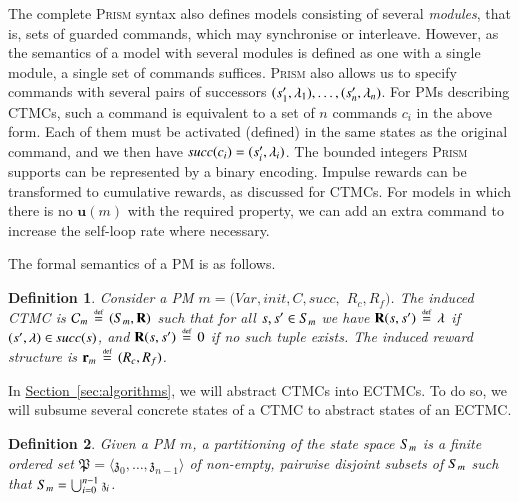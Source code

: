\documentclass[10pt,twocolumn]{article}
\newtheorem{definition}{Definition}
\newcommand{\PRISM}{\textsc{Prism}\xspace}
\newcommand{\states} {{\ensuremath S}}
\newcommand{\state}  {{\ensuremath s}}
\newcommand{\rmat}{\mathbf{R}}
\newcommand{\cmodel}{\mathcal{C}}
\newcommand{\urate}{\mathbf{u}}
\newcommand{\rew}{\mathbf{r}}
\newcommand{\apart}{\mathfrak{P}}
\newcommand{\astate}{\mathfrak{z}}
\newcommand{\prismModel}{m}
\newcommand{\prismVars}{\mathit{Var}}
\newcommand{\prismInit}{\mathit{init}}
\newcommand{\prismSucc}{\mathit{succ}}
\newcommand{\prismCmds}{C}
\newcommand{\prismCmd}{c}
\newcommand{\prismCRew}{R_c}
\newcommand{\prismFRew}{R_f}
\newcommand{\refsec}[1]{\texorpdfstring{\hyperref[sec:#1]{Section~\ref*{sec:#1}}}{Section~\ref*{sec:#1}}}
\newcommand{\defeq}{\,\stackrel{\mbox{\rm {\tiny def}}}{=}\,}
\begin{document}
The complete \PRISM syntax also defines models consisting of several \emph{modules}, that is, sets of guarded commands, which may synchronise or interleave.
However, as the semantics of a model with several modules is defined as one with a single module, a single set of commands suffices.
\PRISM also allows us to specify commands with several pairs of successors $(\state_1',\lambda_1), \ldots, (\state_n', \lambda_n)$.
For PMs describing CTMCs, such a command is equivalent to a set of $n$ commands $\prismCmd_i$ in the above form.
Each of them must be activated (defined) in the same states as the original command, and we then have $\prismSucc(\prismCmd_i) = (\state_i', \lambda_i)$.
The bounded integers \PRISM supports can be represented by a binary encoding.
Impulse rewards can be transformed to cumulative rewards, as discussed for CTMCs.
For models in which there is no $\urate(\prismModel)$ with the required property, we can add an extra command to increase the self-loop rate where necessary.

The formal semantics of a PM is as follows.
\begin{definition}
\label{def:induced-ctmc-rewards}
  Consider a PM $\prismModel = (\prismVars, \prismInit, \prismCmds, \prismSucc,$ $\prismCRew, \prismFRew)$.
  The \emph{induced CTMC} is $\cmodel_\prismModel \defeq (\states_\prismModel, \rmat)$ 
such that for all $\state, \state' \in \states_\prismModel$ we have
$\rmat(\state, \state') \defeq \lambda$ if $(\state',\lambda) \in \prismSucc(\state)$, and $\rmat(\state, \state') \defeq 0$ if no such tuple exists.
  The \emph{induced reward structure} is $\rew_\prismModel \defeq (\prismCRew, \prismFRew)$.
\end{definition}

In \refsec{algorithms}, we will abstract CTMCs into ECTMCs.
To do so, we will subsume several concrete states of a CTMC to abstract states of an ECTMC.
\begin{definition}
  \label{def:partitioning}
  Given a PM $\prismModel$, a \emph{partitioning} of the state space
  $\states_{\prismModel}$ is a finite ordered set $\apart = \langle\astate_0,\ldots,\astate_{n-1}\rangle$ of
  non-empty, pairwise disjoint subsets of $\states_{\prismModel}$ such that
  $\states_{\prismModel} = \bigcup_{i=0}^{n-1}\astate_i$.  
\end{definition}
\end{document}
